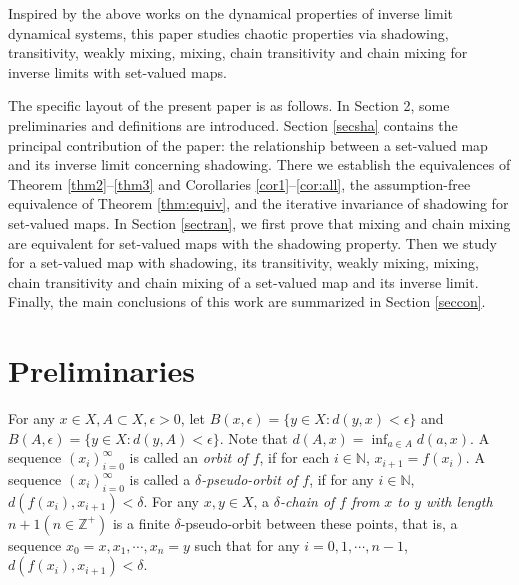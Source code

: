 \documentclass[12pt]{amsart}
\theoremstyle{definition}
\begin{document}
Inspired by the above works on the dynamical properties of inverse limit dynamical systems, this paper studies chaotic properties via shadowing, transitivity, weakly mixing, mixing, chain transitivity and chain mixing for inverse limits with set-valued maps.

The specific layout of the present paper is
as follows.  In Section 2, some preliminaries and definitions are
introduced. Section \ref{secsha} contains the principal contribution of the paper: the relationship between a set-valued map and its inverse limit concerning shadowing. There we establish the equivalences of Theorem \ref{thm2}--\ref{thm3} and Corollaries \ref{cor1}--\ref{cor:all}, the assumption-free equivalence of Theorem \ref{thm:equiv}, and the iterative invariance of shadowing for set-valued maps. In Section \ref{sectran}, we first prove that mixing and chain mixing are equivalent for set-valued maps with the shadowing property. Then we study for a set-valued map with shadowing, its  transitivity, weakly mixing, mixing, chain transitivity and chain mixing of a set-valued map and its inverse limit. Finally, the main conclusions of this work are summarized in Section \ref{seccon}.

\section{Preliminaries}\label{sec2}
For any $x\in X, A\subset X, \epsilon>0$, let $B(x,\epsilon)=\{y\in X: d(y,x)<\epsilon\}$ and $B(A,\epsilon)=\{y\in X: d(y, A)<\epsilon\}$. Note that $d(A, x)=\inf_{a\in A}d(a,x)$. A sequence $(x_i)_{i=0}^\infty$ is called an \emph{orbit of $f$}, if for each $i\in \mathbb{N}$, $x_{i+1}=f(x_i)$. A sequence $(x_i)_{i=0}^\infty$ is called a \emph{$\delta$-pseudo-orbit of $f$}, if for any $i\in \mathbb{N}$, $d(f(x_i),x_{i+1})<\delta$. For any $x,y\in X$, a \emph{$\delta$-chain of $f$ from $x$ to $y$ with length $n+1(n\in\mathbb{Z}^+)$} is a finite $\delta$-pseudo-orbit between these points, that is, a sequence $x_0=x,x_1,\cdots,x_{n}=y$ such that for any $i=0,1,\cdots,n-1$, $d(f(x_i),x_{i+1})<\delta$.
\end{document}
